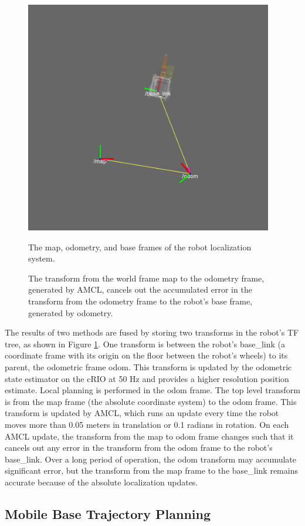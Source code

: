 \documentclass[]{cwru} %
\begin{document}
\begin{figure}[h]
\centering
\includegraphics[height=4.0in]{odom_frames}
\caption{The map, odometry, and base frames of the robot localization system.}
\caption*{The transform from the world frame map to the odometry frame, 
generated by AMCL, cancels out the accumulated error in the transform from 
the odometry frame to the robot's base frame, generated by odometry.}
\label{fig:tfs}
\end{figure}

The results of two methods are fused by storing two transforms in the
robot's TF tree, as shown in Figure \ref{fig:tfs}. One transform is between the
robot's base\_link (a coordinate frame with its origin on the floor
between the robot's wheels) to its parent, the odometric frame odom.
This transform is updated by the odometric state estimator on the cRIO
at 50 Hz and provides a higher resolution position estimate. Local
planning is performed in the odom frame. The top level transform is from
the map frame (the absolute coordinate system) to the odom frame. This
transform is updated by AMCL, which runs an update every time the robot
moves more than 0.05 meters in translation or 0.1 radians in rotation.
On each AMCL update, the transform from the map to odom frame changes
such that it cancels out any error in the transform from the odom frame
to the robot's base\_link. Over a long period of operation, the odom
transform may accumulate significant error, but the transform from the
map frame to the base\_link remains accurate because of the absolute
localization updates.

\subsection{Mobile Base Trajectory Planning}
\end{document}
